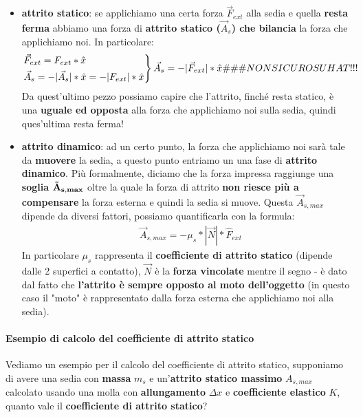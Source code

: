             \begin{itemize}
                \item \textbf{attrito statico}: se applichiamo una certa forza $\vec{F}_{ext}$ alla sedia e quella \textbf{resta ferma} abbiamo una forza di \textbf{attrito statico ($\vec{A}_s$) che bilancia} la forza che applichiamo noi. In particolare:
                \begin{align*}
                    \begin{rcases*}
                        \vec{F}_{ext}=F_{ext}*\hat{x}\\
                        \vec{A}_{s}= -|\vec{A}_s|*\hat{x}=-|F_{ext}|*\hat{x}
                    \end{rcases*}
                    \vec{A}_s=-|\vec{F}_{ext}|*\hat{x} \#\#\#NON SICURO SU HAT!!!
                \end{align*}
                Da quest'ultimo pezzo possiamo capire che l'attrito, finché resta statico, è una \textbf{uguale ed opposta} alla forza che applichiamo noi sulla sedia, quindi ques'ultima resta ferma!
                \item \textbf{attrito dinamico}: ad un certo punto, la forza che applichiamo noi sarà tale da \textbf{muovere} la sedia, a questo punto entriamo un una fase di \textbf{attrito dinamico}. Più formalmente, diciamo che la forza impressa raggiunge una \textbf{soglia $\bf{\vec{A}_{s, max}}$} oltre la quale la forza di attrito \textbf{non riesce più a compensare} la forza esterna e quindi la sedia si muove. Questa $\vec{A}_{s, max}$ dipende da diversi fattori, possiamo quantificarla con la formula:
                \begin{align*}
                    &\vec{A}_{s, max} = -\mu_s*|\vec{N}|*\hat{F}_{ext}
                \end{align*}
                In particolare $\mu_s$ rappresenta il \textbf{coefficiente di attrito statico} (dipende dalle 2 superfici a contatto), $\vec{N}$ è la \textbf{forza vincolate} mentre il segno - è dato dal fatto che \textbf{l'attrito è sempre opposto al moto dell'oggetto} (in questo caso il "moto" è rappresentato dalla forza esterna che applichiamo noi alla sedia).
            \end{itemize}

            \paragraph{Esempio di calcolo del coefficiente di attrito statico}
                Vediamo un esempio per il calcolo del coefficiente di attrito statico, supponiamo di avere una sedia con \textbf{massa} $m_s$ e un'\textbf{attrito statico massimo} $A_{s,max}$ calcolato usando una molla con \textbf{allungamento} $\Delta x$ e \textbf{coefficiente elastico} $K$, quanto vale il \textbf{coefficiente di attrito statico}?
